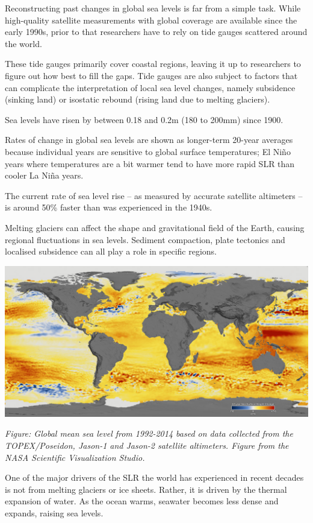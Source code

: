 \documentclass[
]{book}
\begin{document}
Reconstructing past changes in global sea levels is far from a simple task. While high-quality satellite measurements with global coverage are available since the early 1990s, prior to that researchers have to rely on tide gauges scattered around the world.

These tide gauges primarily cover coastal regions, leaving it up to researchers to figure out how best to fill the gaps. Tide gauges are also subject to factors that can complicate the interpretation of local sea level changes, namely subsidence (sinking land) or isostatic rebound (rising land due to melting glaciers).

Sea levels have risen by between 0.18 and 0.2m (180 to 200mm) since 1900.

Rates of change in global sea levels are shown as longer-term 20-year averages because individual years are sensitive to global surface temperatures; El Niño years where temperatures are a bit warmer tend to have more rapid SLR than cooler La Niña years.

The current rate of sea level rise -- as measured by accurate satellite altimeters -- is around 50\% faster than was experienced in the 1940s.

Melting glaciers can affect the shape and gravitational field of the Earth, causing regional fluctuations in sea levels. Sediment compaction, plate tectonics and localised subsidence can all play a role in specific regions.

\includegraphics{fig/sea_level_rise.jpg}

\emph{Figure: Global mean sea level from 1992-2014 based on data collected from the TOPEX/Poseidon, Jason-1 and Jason-2 satellite altimeters. Figure from the NASA Scientific Visualization Studio.}

One of the major drivers of the SLR the world has experienced in recent decades is not from melting glaciers or ice sheets. Rather, it is driven by the thermal expansion of water. As the ocean warms, seawater becomes less dense and expands, raising sea levels.
\end{document}
